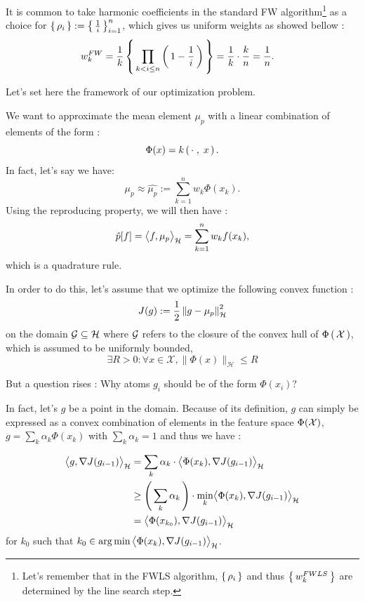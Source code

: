 It is common to take harmonic coefficients in the standard FW algorithm\footnote{Let's remember that in the FWLS algorithm, $\left \{ \, \rho_i \, \right \}$ and thus $\left \{ \, w_k^{FWLS} \, \right \}$ are
determined by the line search step.} as a choice for $\left \{ \, \rho_i \, \right \}:= \left \{ \, \frac{1}{i} \, \right \}_{i=1}^n$,
 which gives us uniform weights as showed bellow :
 \begin{align*}
w_k^{FW} &= \frac{1}{k} \left \{ \, \prod_{k<i\leq n} \left( \, 1-\frac{1}{i} \, \right) \, \right \}= \frac{1}{k} \cdot \frac{k}{n} = \frac{1}{n}.
\end{align*}

Let's set here the framework of our optimization problem.

\begin{boxproblem}
  We want to approximate the mean element $\mu_p$ with a linear combination of
  elements of the form :$$\Phi(x)= k\left( \, \cdot\;,\; x \, \right).$$
  In fact, let's say we have:
   $$\mu_p \approx \hat{\mu_p} := \sum_{k=1}^n w_k \Phi(x_k).$$
   Using the reproducing property, we will then have :
   $$\hat{p}[f]= \bigl \langle f , \mu_p \bigr \rangle_{\mathcal{H}} = \sum_{k=1}^n w_k f(x_k),$$
   which is a quadrature rule.

   In order to do this, let's assume that we optimize the following convex function :
   \begin{equation}
     J(g):= \frac{1}{2} \norme{g-\mu_p}^2
   \end{equation}
on the domain $\mathcal{G} \subseteq \mathcal{H}$ where $\mathcal{G}$ refers to the closure of the convex hull
of $\Phi\left( \, \mathcal{X} \, \right)$, which is assumed to be uniformly bounded, \ie
\begin{equation*}
  \exists R > 0 : \forall x \in \mathcal { X } , \| \Phi ( x ) \| _ { \mathcal { H } } \leq R
\end{equation*}

\end{boxproblem}
But a question rises : Why atoms $g_i$ should be of the form $\Phi(x_i)$?

In fact, let's
 $g$ be a point in the domain. Because of its definition,
  $g$ can simply be expressed as a convex combination of elements in the feature space $\Phi(\mathcal{X})$, \ie $g = \sum_k \alpha_k \Phi(x_k)$ with $\sum_k \alpha_k=1$ and thus we have :
  \begin{boxcomputation}
    \begin{align*}
      \bigl \langle g , \operatorname{\nabla\!}{J}(g_{i-1}) \bigr \rangle_{\mathcal{H}} &= \sum_k \alpha_k \cdot \bigl \langle \Phi(x_k) , \operatorname{\nabla\!}{J}(g_{i-1}) \bigr \rangle_{\mathcal{H}}\\
      &\geq \left( \, \sum_k \alpha_k \, \right) \cdot \min_{k} \bigl \langle \Phi(x_k) , \operatorname{\nabla\!}{J}(g_{i-1}) \bigr \rangle_{\mathcal{H}}\\
      &= \bigl \langle \Phi(x_{k_0}) , \operatorname{\nabla\!}{J}(g_{i-1}) \bigr \rangle_{\mathcal{H}}
    \end{align*}
    for $k_0$ such that $k_0 \in \operatorname*{arg\,min}{\bigl \langle \Phi(x_k) , \operatorname{\nabla\!}{J}(g_{i-1}) \bigr \rangle_{\mathcal{H}}}$.
  \end{boxcomputation}


